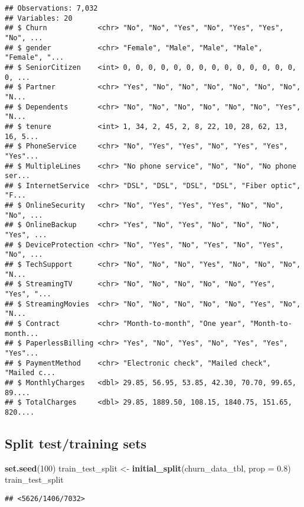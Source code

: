 \documentclass[]{article}
\newenvironment{Shaded}{\begin{snugshade}}{\end{snugshade}}
\newcommand{\KeywordTok}[1]{\textcolor[rgb]{0.13,0.29,0.53}{\textbf{#1}}}
\newcommand{\DataTypeTok}[1]{\textcolor[rgb]{0.13,0.29,0.53}{#1}}
\newcommand{\DecValTok}[1]{\textcolor[rgb]{0.00,0.00,0.81}{#1}}
\newcommand{\FloatTok}[1]{\textcolor[rgb]{0.00,0.00,0.81}{#1}}
\newcommand{\StringTok}[1]{\textcolor[rgb]{0.31,0.60,0.02}{#1}}
\newcommand{\NormalTok}[1]{#1}
\begin{document}
\begin{verbatim}
## Observations: 7,032
## Variables: 20
## $ Churn            <chr> "No", "No", "Yes", "No", "Yes", "Yes", "No", ...
## $ gender           <chr> "Female", "Male", "Male", "Male", "Female", "...
## $ SeniorCitizen    <int> 0, 0, 0, 0, 0, 0, 0, 0, 0, 0, 0, 0, 0, 0, 0, ...
## $ Partner          <chr> "Yes", "No", "No", "No", "No", "No", "No", "N...
## $ Dependents       <chr> "No", "No", "No", "No", "No", "No", "Yes", "N...
## $ tenure           <int> 1, 34, 2, 45, 2, 8, 22, 10, 28, 62, 13, 16, 5...
## $ PhoneService     <chr> "No", "Yes", "Yes", "No", "Yes", "Yes", "Yes"...
## $ MultipleLines    <chr> "No phone service", "No", "No", "No phone ser...
## $ InternetService  <chr> "DSL", "DSL", "DSL", "DSL", "Fiber optic", "F...
## $ OnlineSecurity   <chr> "No", "Yes", "Yes", "Yes", "No", "No", "No", ...
## $ OnlineBackup     <chr> "Yes", "No", "Yes", "No", "No", "No", "Yes", ...
## $ DeviceProtection <chr> "No", "Yes", "No", "Yes", "No", "Yes", "No", ...
## $ TechSupport      <chr> "No", "No", "No", "Yes", "No", "No", "No", "N...
## $ StreamingTV      <chr> "No", "No", "No", "No", "No", "Yes", "Yes", "...
## $ StreamingMovies  <chr> "No", "No", "No", "No", "No", "Yes", "No", "N...
## $ Contract         <chr> "Month-to-month", "One year", "Month-to-month...
## $ PaperlessBilling <chr> "Yes", "No", "Yes", "No", "Yes", "Yes", "Yes"...
## $ PaymentMethod    <chr> "Electronic check", "Mailed check", "Mailed c...
## $ MonthlyCharges   <dbl> 29.85, 56.95, 53.85, 42.30, 70.70, 99.65, 89....
## $ TotalCharges     <dbl> 29.85, 1889.50, 108.15, 1840.75, 151.65, 820....
\end{verbatim}

\subsection{Split test/training sets}\label{split-testtraining-sets}

\begin{Shaded}
\begin{Highlighting}[]
\KeywordTok{set.seed}\NormalTok{(}\DecValTok{100}\NormalTok{)}
\NormalTok{train_test_split <-}\StringTok{ }\KeywordTok{initial_split}\NormalTok{(churn_data_tbl, }\DataTypeTok{prop =} \FloatTok{0.8}\NormalTok{)}
\NormalTok{train_test_split}
\end{Highlighting}
\end{Shaded}

\begin{verbatim}
## <5626/1406/7032>
\end{verbatim}
\end{document}
